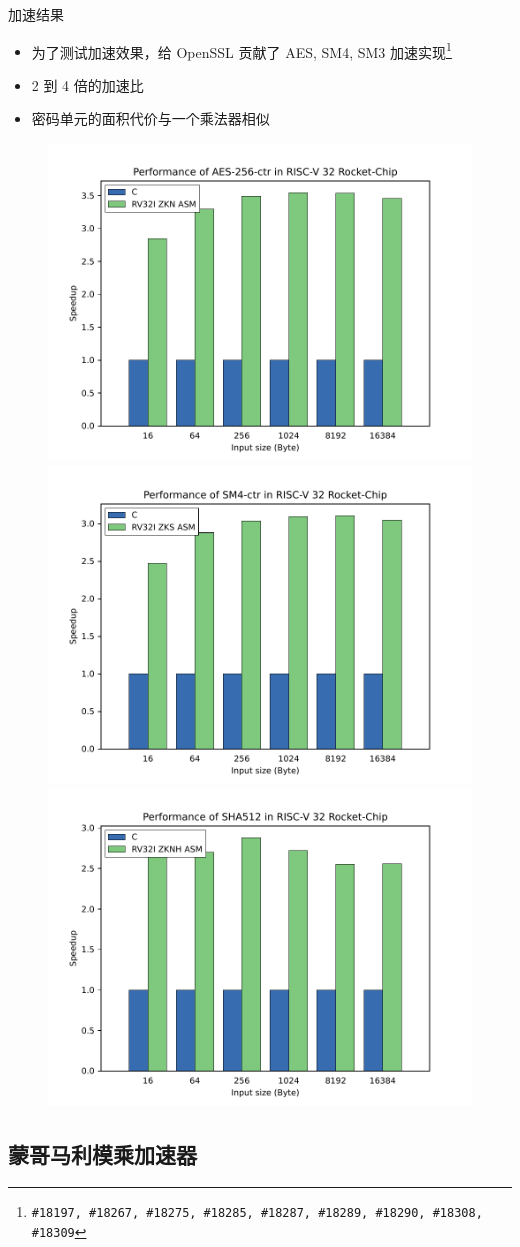 \documentclass[aspectratio=169]{ctexbeamer}
\begin{document}
\begin{frame}{加速结果}
  \begin{itemize}
    \item 为了测试加速效果，给 OpenSSL 贡献了 AES, SM4, SM3 加速实现\footnote{\texttt{\#18197, \#18267, \#18275, \#18285, \#18287, \#18289, \#18290, \#18308, \#18309}}
    \item 2 到 4 倍的加速比
    \item 密码单元的面积代价与一个乘法器相似
  \end{itemize}
  \begin{figure}
    \centering
    {\includegraphics[width=0.3\linewidth]{img/aes-256-ctr.pdf}}
    {\includegraphics[width=0.3\linewidth]{img/sm4-ctr.pdf}}
    {\includegraphics[width=0.3\linewidth]{img/sha512-rv32.pdf}}
  \end{figure}
\end{frame}

\subsection{蒙哥马利模乘加速器}
\end{document}
